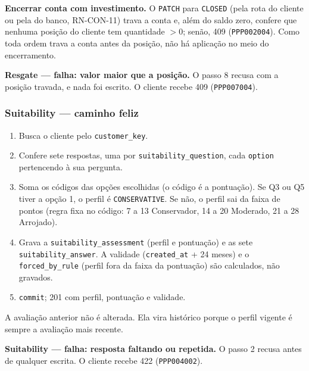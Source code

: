 \documentclass[11pt,a4paper]{article}
\newcommand{\tb}[1]{\texttt{#1}}
\begin{document}
\textbf{Encerrar conta com investimento.} O \tb{PATCH} para \tb{CLOSED} (pela rota do cliente ou
pela do banco, RN-CON-11) trava a conta e, além do
saldo zero, confere que nenhuma posição do cliente tem quantidade $> 0$; senão, 409
(\tb{PPP002004}). Como toda ordem trava a conta antes da posição, não há aplicação no meio do
encerramento.

\textbf{Resgate --- falha: valor maior que a posição.} O passo 8 recusa com a posição travada, e
nada foi escrito. O cliente recebe 409 (\tb{PPP007004}).

\subsubsection*{Suitability --- caminho feliz}
\begin{enumerate}
  \item Busca o cliente pelo \tb{customer_key}.
  \item Confere sete respostas, uma por \tb{suitability_question}, cada \tb{option} pertencendo à
        sua pergunta.
  \item Soma os códigos das opções escolhidas (o código é a pontuação). Se Q3 ou Q5 tiver a
        opção 1, o perfil é \tb{CONSERVATIVE}. Se não, o perfil sai da faixa de pontos (regra
        fixa no código: 7 a 13 Conservador, 14 a 20 Moderado, 21 a 28 Arrojado).
  \item Grava a \tb{suitability_assessment} (perfil e pontuação) e as sete
        \tb{suitability_answer}. A validade (\tb{created_at} + 24 meses) e o
        \tb{forced_by_rule} (perfil fora da faixa da pontuação) são calculados, não gravados.
  \item \tb{commit}; 201 com perfil, pontuação e validade.
\end{enumerate}
A avaliação anterior não é alterada. Ela vira histórico porque o perfil vigente é sempre a
avaliação mais recente.

\textbf{Suitability --- falha: resposta faltando ou repetida.} O passo 2 recusa antes de qualquer
escrita. O cliente recebe 422 (\tb{PPP004002}).

\end{document}
